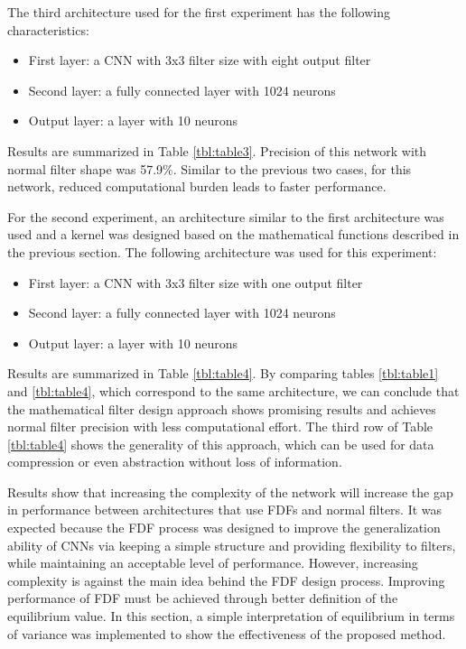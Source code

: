 \documentclass[journal]{IEEEtran}
\begin{document}
The third architecture used for the first experiment has the following characteristics:
\begin{itemize}
\item First layer: a CNN with 3x3 filter size with eight output filter
\item Second layer: a fully connected layer with 1024 neurons
\item Output layer: a layer with 10 neurons
\end{itemize}
Results are summarized in Table \ref{tbl:table3}. Precision of this network with normal filter shape was 57.9\%. Similar to the previous two cases, for this network, reduced computational burden leads to faster performance.

For the second experiment, an architecture similar to the first architecture was used and a kernel was designed based on the mathematical functions described in the previous section. The following architecture was used for this experiment:
\begin{itemize}
\item First layer: a CNN with 3x3 filter size with one output filter
\item Second layer: a fully connected layer with 1024 neurons
\item Output layer: a layer with 10 neurons
\end{itemize}
Results are summarized in Table \ref{tbl:table4}. By comparing tables \ref{tbl:table1} and \ref{tbl:table4}, which correspond to the same architecture, we can conclude that the mathematical filter design approach shows promising results and achieves normal filter precision with less computational effort. The third row of Table \ref{tbl:table4} shows the generality of this approach, which can be used for data compression or even abstraction without loss of information. 

Results show that increasing the complexity of the network will increase the gap in performance between architectures that use FDFs and normal filters. It was expected because the FDF process was designed to improve the generalization ability of CNNs via keeping a simple structure and providing flexibility to filters, while maintaining an acceptable level of performance. However, increasing complexity is against the main idea behind the FDF design process. Improving performance of FDF must be achieved through better definition of the equilibrium value. In this section, a simple interpretation of equilibrium in terms of variance was implemented to show the effectiveness of the proposed method.
\end{document}
